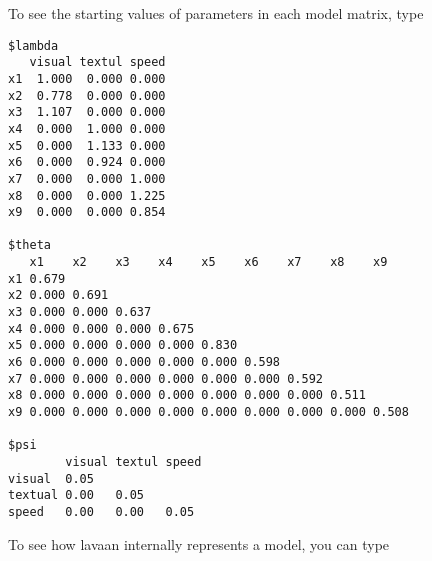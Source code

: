 To see the starting values of parameters in each model matrix, type

\begin{Shaded}
\begin{Highlighting}[]
\NormalTok{)}
\end{Highlighting}
\end{Shaded}

\begin{verbatim}
$lambda
   visual textul speed
x1  1.000  0.000 0.000
x2  0.778  0.000 0.000
x3  1.107  0.000 0.000
x4  0.000  1.000 0.000
x5  0.000  1.133 0.000
x6  0.000  0.924 0.000
x7  0.000  0.000 1.000
x8  0.000  0.000 1.225
x9  0.000  0.000 0.854

$theta
   x1    x2    x3    x4    x5    x6    x7    x8    x9   
x1 0.679                                                
x2 0.000 0.691                                          
x3 0.000 0.000 0.637                                    
x4 0.000 0.000 0.000 0.675                              
x5 0.000 0.000 0.000 0.000 0.830                        
x6 0.000 0.000 0.000 0.000 0.000 0.598                  
x7 0.000 0.000 0.000 0.000 0.000 0.000 0.592            
x8 0.000 0.000 0.000 0.000 0.000 0.000 0.000 0.511      
x9 0.000 0.000 0.000 0.000 0.000 0.000 0.000 0.000 0.508

$psi
        visual textul speed
visual  0.05               
textual 0.00   0.05        
speed   0.00   0.00   0.05 
\end{verbatim}

To see how lavaan internally represents a model, you can type

\begin{Shaded}
\begin{Highlighting}[]
\NormalTok{)}
\end{Highlighting}
\end{Shaded}

